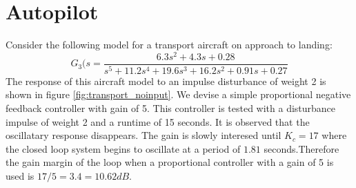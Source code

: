 \documentclass{article}
\begin{document}
\section{Autopilot}
Consider the following model for a transport aircraft on approach to landing:
\begin{equation}
	G_3(s=\dfrac{6.3s^2+4.3s+0.28}{s^5+11.2s^4+19.6s^3+16.2s^2+0.91s+0.27}
\end{equation}
The response of this aircraft model to an impulse disturbance of weight 2 is shown in figure \ref{fig:transport_noinput}. We devise a simple proportional negative feedback controller with gain of 5. This controller is tested with a disturbance impulse of weight 2 and a runtime of 15 seconds. It is observed that the oscillatary response disappears. The gain is slowly interesed until $K_c=17$ where the closed loop system begins to oscillate at a period of $1.81$ seconds.Therefore the gain margin of the loop when a proportional controller with a gain of 5 is used is $17/5=3.4=10.62dB$.
\end{document}
